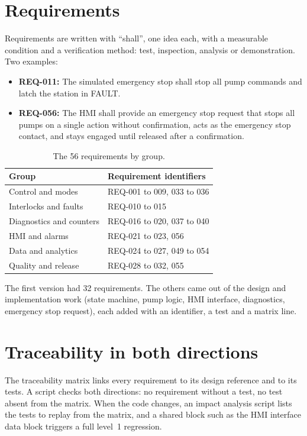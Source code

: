 \documentclass[11pt,a4paper]{report}
\begin{document}
	\section{Requirements}
	
	Requirements are written with ``shall'', one idea each, with a measurable condition and a verification method: test, inspection, analysis or demonstration. Two examples:
	
	\begin{itemize}
		\item \textbf{REQ-011:} The simulated emergency stop shall stop all pump commands and latch the station in FAULT.
		\item \textbf{REQ-056:} The HMI shall provide an emergency stop request that stops all pumps on a single action without confirmation, acts as the emergency stop contact, and stays engaged until released after a confirmation.
	\end{itemize}
	
	\begin{table}[H]\centering\small
		\begin{tabularx}{\linewidth}{|l|Y|}
			\hline
			Group & Requirement identifiers \\
			\hline
			Control and modes & REQ-001 to 009, 033 to 036 \\
			Interlocks and faults & REQ-010 to 015 \\
			Diagnostics and counters & REQ-016 to 020, 037 to 040 \\
			HMI and alarms & REQ-021 to 023, 056 \\
			Data and analytics & REQ-024 to 027, 049 to 054 \\
			Quality and release & REQ-028 to 032, 055 \\
			\hline
		\end{tabularx}
		\caption{The 56 requirements by group.}\label{tab:req}
	\end{table}
	
	The first version had 32 requirements. The others came out of the design and implementation work (state machine, pump logic, HMI interface, diagnostics, emergency stop request), each added with an identifier, a test and a matrix line.
	
	\section{Traceability in both directions}
	
	The traceability matrix links every requirement to its design reference and to its tests. A script checks both directions: no requirement without a test, no test absent from the matrix. When the code changes, an impact analysis script lists the tests to replay from the matrix, and a shared block such as the HMI interface data block triggers a full level~1 regression.
	
\end{document}
